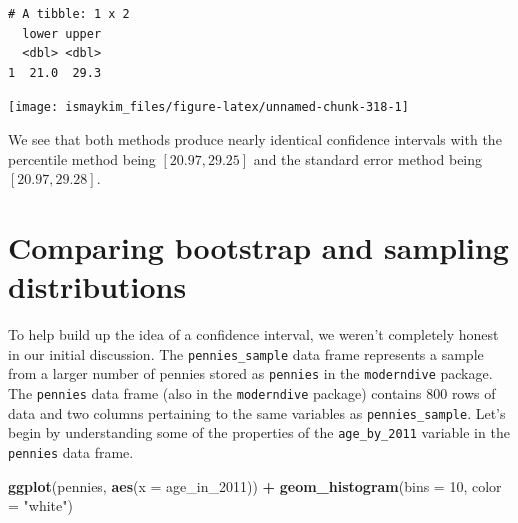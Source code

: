 \documentclass[12pt,]{krantz}
\makeatletter
\newenvironment{Shaded}{\begin{snugshade}}{\end{snugshade}}
\newcommand{\KeywordTok}[1]{\textcolor[rgb]{0.27,0.27,0.27}{\textbf{#1}}}
\newcommand{\DataTypeTok}[1]{\textcolor[rgb]{0.27,0.27,0.27}{#1}}
\newcommand{\DecValTok}[1]{\textcolor[rgb]{0.06,0.06,0.06}{#1}}
\newcommand{\StringTok}[1]{\textcolor[rgb]{0.5,0.5,0.5}{#1}}
\newcommand{\OperatorTok}[1]{\textcolor[rgb]{0.43,0.43,0.43}{\textbf{#1}}}
\newcommand{\NormalTok}[1]{#1}
\newenvironment{kframe}{%
\medskip{}
\setlength{\fboxsep}{.8em}
 \def\at@end@of@kframe{}%
 \ifinner\ifhmode%
  \def\at@end@of@kframe{\end{minipage}}%
  \begin{minipage}{\columnwidth}%
 \fi\fi%
 \def\FrameCommand##1{\hskip\@totalleftmargin \hskip-\fboxsep
 \colorbox{shadecolor}{##1}\hskip-\fboxsep
     \hskip-\linewidth \hskip-\@totalleftmargin \hskip\columnwidth}%
 \MakeFramed {\advance\hsize-\width
   \@totalleftmargin\z@ \linewidth\hsize
   \@setminipage}}%
 {\par\unskip\endMakeFramed%
 \at@end@of@kframe}
\renewenvironment{Shaded}{\begin{kframe}}{\end{kframe}}
\theoremstyle{definition}
\theoremstyle{definition}
\theoremstyle{definition}
\theoremstyle{remark}
\makeatother
\begin{document}
\begin{verbatim}
# A tibble: 1 x 2
  lower upper
  <dbl> <dbl>
1  21.0  29.3
\end{verbatim}

\begin{Shaded}
\end{Shaded}

\begin{center}\texttt{[image: ismaykim\_files/figure-latex/unnamed-chunk-318-1]} \end{center}

We see that both methods produce nearly identical confidence intervals
with the percentile method being \([20.97, 29.25]\) and the standard
error method being \([20.97, 29.28]\).

\section{Comparing bootstrap and sampling
distributions}\label{comparing-bootstrap-and-sampling-distributions}

To help build up the idea of a confidence interval, we weren't
completely honest in our initial discussion. The
\texttt{pennies\_sample} data frame represents a sample from a larger
number of pennies stored as \texttt{pennies} in the \texttt{moderndive}
package. The \texttt{pennies} data frame (also in the
\texttt{moderndive} package) contains 800 rows of data and two columns
pertaining to the same variables as \texttt{pennies\_sample}. Let's
begin by understanding some of the properties of the
\texttt{age\_by\_2011} variable in the \texttt{pennies} data frame.

\begin{Shaded}
\begin{Highlighting}[]
\KeywordTok{ggplot}\NormalTok{(pennies, }\KeywordTok{aes}\NormalTok{(}\DataTypeTok{x =}\NormalTok{ age_in_}\DecValTok{2011}\NormalTok{)) }\OperatorTok{+}
\StringTok{  }\KeywordTok{geom_histogram}\NormalTok{(}\DataTypeTok{bins =} \DecValTok{10}\NormalTok{, }\DataTypeTok{color =} \StringTok{"white"}\NormalTok{)}
\end{Highlighting}
\end{Shaded}
\end{document}
